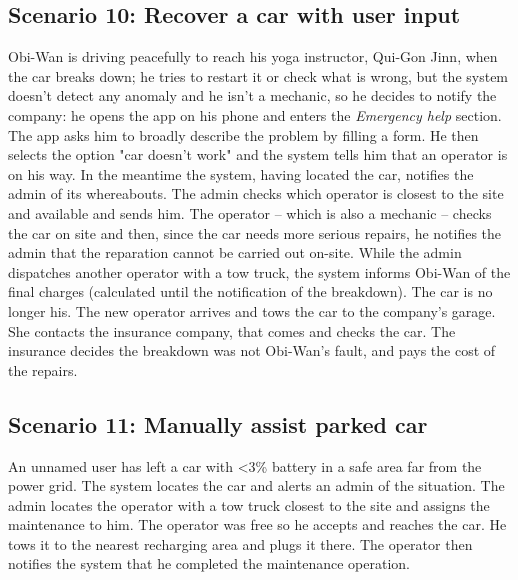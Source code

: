 \subsection{Scenario 10: Recover a car with user input}
	Obi-Wan is driving peacefully to reach his yoga instructor, Qui-Gon Jinn, when the car breaks down; he tries to restart it or check what is wrong, but the system doesn't detect any anomaly and he isn't a mechanic, so he decides to notify the company: he opens the app on his phone and enters the \textit{Emergency help} section. The app asks him to broadly describe the problem by filling a form. He then selects the option "car doesn't work" and the system tells him that an operator is on his way. In the meantime the system, having located the car, notifies the admin of its whereabouts. The admin checks which operator is closest to the site and available and sends him. The operator – which is also a mechanic – checks the car on site and then, since the car needs more serious repairs, he notifies the admin that the reparation cannot be carried out on-site. While the admin dispatches another operator with a tow truck, the system informs Obi-Wan of the final charges (calculated until the notification of the breakdown). The car is no longer his. 
	The new operator arrives and tows the car to the company's garage. She contacts the insurance company, that comes and checks the car. The insurance decides the breakdown was not Obi-Wan's fault, and pays the cost of the repairs.
	
\subsection{Scenario 11: Manually assist parked car}
	An unnamed user has left a car with <3\% battery in a safe area far from the power grid. The system locates the car and alerts an admin of the situation. The admin locates the operator with a tow truck closest to the site and assigns the maintenance to him. The operator was free so he accepts and reaches the car. He tows it to the nearest recharging area and plugs it there. The operator then notifies the system that he completed the maintenance operation.